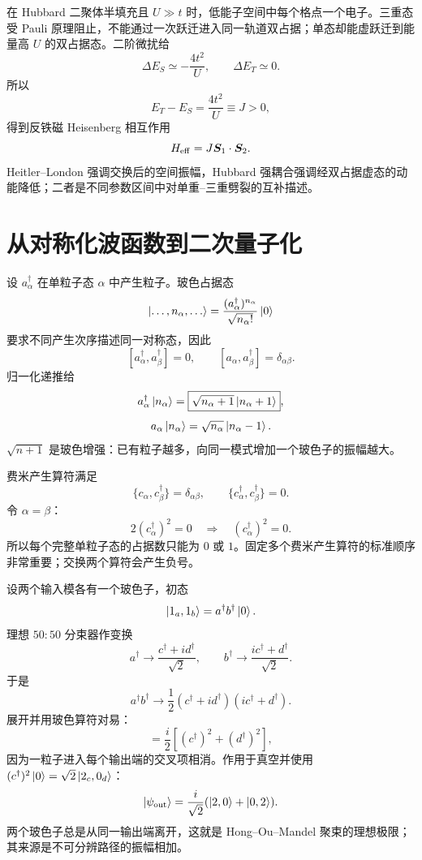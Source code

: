 \begin{examplebox}[title=例 5：与 Hubbard 二聚体的联系]
在 Hubbard 二聚体半填充且 $U\gg t$ 时，低能子空间中每个格点一个电子。三重态受 Pauli 原理阻止，不能通过一次跃迁进入同一轨道双占据；单态却能虚跃迁到能量高 $U$ 的双占据态。二阶微扰给
\[
\Delta E_S\simeq-\frac{4t^2}{U},\qquad
\Delta E_T\simeq0.
\]
所以
\[
E_T-E_S=\frac{4t^2}{U}\equiv J>0,
\]
得到反铁磁 Heisenberg 相互作用
\[
H_{\rm eff}=J\bm{S}_1\cdot\bm{S}_2.
\]
Heitler--London 强调交换后的空间振幅，Hubbard 强耦合强调经双占据虚态的动能降低；二者是不同参数区间中对单重--三重劈裂的互补描述。
\end{examplebox}

\section{从对称化波函数到二次量子化}
设 $a_\alpha^\dagger$ 在单粒子态 $\alpha$ 中产生粒子。玻色占据态
\[
\left|\ldots,n_\alpha,\ldots\right\rangle
=\frac{(a_\alpha^\dagger)^{n_\alpha}}
{\sqrt{n_\alpha!}}\left|0\right\rangle
\]
要求不同产生次序描述同一对称态，因此
\[
[a_\alpha^\dagger,a_\beta^\dagger]=0,
\qquad
[a_\alpha,a_\beta^\dagger]=\delta_{\alpha\beta}.
\]
归一化递推给
\[
a_\alpha^\dagger\left|n_\alpha\right\rangle
=\boxed{\sqrt{n_\alpha+1}\left|n_\alpha+1\right\rangle},
\]
\[
a_\alpha\left|n_\alpha\right\rangle
=\sqrt{n_\alpha}\left|n_\alpha-1\right\rangle.
\]
$\sqrt{n+1}$ 是玻色增强：已有粒子越多，向同一模式增加一个玻色子的振幅越大。

费米产生算符满足
\[
\{c_\alpha,c_\beta^\dagger\}=\delta_{\alpha\beta},
\qquad
\{c_\alpha^\dagger,c_\beta^\dagger\}=0.
\]
令 $\alpha=\beta$：
\[
2(c_\alpha^\dagger)^2=0
\quad\Rightarrow\quad
\boxed{(c_\alpha^\dagger)^2=0}.
\]
所以每个完整单粒子态的占据数只能为 $0$ 或 $1$。固定多个费米产生算符的标准顺序非常重要；交换两个算符会产生负号。

\begin{examplebox}[title=例 6：两玻色子的分束器聚束]
设两个输入模各有一个玻色子，初态
\[
\left|1_a,1_b\right\rangle=a^\dagger b^\dagger\left|0\right\rangle.
\]
理想 $50{:}50$ 分束器作变换
\[
a^\dagger\to\frac{c^\dagger+id^\dagger}{\sqrt2},
\qquad
b^\dagger\to\frac{ic^\dagger+d^\dagger}{\sqrt2}.
\]
于是
\[
a^\dagger b^\dagger
\to\frac12(c^\dagger+id^\dagger)
(ic^\dagger+d^\dagger).
\]
展开并用玻色算符对易：
\[
=\frac{i}{2}\left[(c^\dagger)^2+(d^\dagger)^2\right],
\]
因为一粒子进入每个输出端的交叉项相消。作用于真空并使用
$(c^\dagger)^2\left|0\right\rangle=\sqrt2\left|2_c,0_d\right\rangle$：
\[
\left|\psi_{\rm out}\right\rangle
=\frac{i}{\sqrt2}
(\left|2,0\right\rangle+\left|0,2\right\rangle).
\]
两个玻色子总是从同一输出端离开，这就是 Hong--Ou--Mandel 聚束的理想极限；其来源是不可分辨路径的振幅相加。
\end{examplebox}

